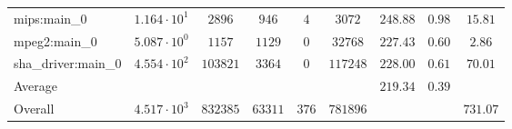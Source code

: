 \begin{tabular}{|l|c|c|c|c|c|c|c|c|}
mips:main\_0            & $ 1.164 \cdot 10^{1}  $ & $ 2896   $ & $ 946   $ & $ 4   $ & $ 3072   $ & $ 248.88      $ & $ 0.98    $ & $ 15.81   $ \\
mpeg2:main\_0           & $ 5.087 \cdot 10^{0}  $ & $ 1157   $ & $ 1129  $ & $ 0   $ & $ 32768  $ & $ 227.43      $ & $ 0.60    $ & $ 2.86    $ \\
sha\_driver:main\_0     & $ 4.554 \cdot 10^{2}  $ & $ 103821 $ & $ 3364  $ & $ 0   $ & $ 117248 $ & $ 228.00      $ & $ 0.61    $ & $ 70.01   $ \\
\hline
Average                 & $                     $ & $        $ & $       $ & $     $ & $        $ & $ 219.34      $ & $ 0.39    $ & $         $ \\
\hline
Overall                 & $ 4.517 \cdot 10^{3}  $ & $ 832385 $ & $ 63311 $ & $ 376 $ & $ 781896 $ & $             $ & $         $ & $ 731.07  $ \\
\hline
\end{tabular}
